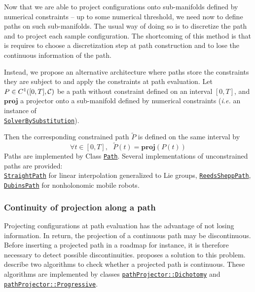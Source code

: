 Now that we are able to project configurations onto sub-manifolds defined by numerical constraints -- up to some numerical threshold, we need now to define paths on such sub-manifolds. The usual way of doing so is to discretize the path and to project each sample configuration. The shortcoming of this method is that is requires to choose a discretization step at path construction and to lose the continuous information of the path.

Instead, we propose an alternative architecture where paths store the constraints they are subject to and apply the constraints at path evaluation. Let $P\in C^1([0,T],\mathcal{C})$ be a path without constraint defined on an interval $[0,T]$, and $\mathbf{proj}$ a projector onto a sub-manifold defined by numerical constraints (\textit{i.e.} an instance of\\ \href{https://gepettoweb.laas.fr/hpp/hpp-constraints/doxygen-html/classhpp_1_1constraints_1_1solver_1_1BySubstitution.html}{\texttt{SolverBySubstitution}}).

Then the corresponding constrained path $\tilde{P}$ is defined on the same interval by
$$
\forall t\in[0,T],\ \ \ \tilde{P}(t) = \mathbf{proj}(P(t))
$$
Paths are implemented by Class \href{https://gepettoweb.laas.fr/hpp/hpp-core/doxygen-html/classhpp_1_1core_1_1Path.html}{\texttt{Path}}. Several implementations of unconstrained paths are provided:\\
\href{https://gepettoweb.laas.fr/hpp/hpp-core/doxygen-html/classhpp_1_1core_1_1StraightPath.html}{\texttt{StraightPath}} for linear interpolation generalized to Lie groups, \href{https://gepettoweb.laas.fr/hpp/hpp-core/doxygen-html/classhpp_1_1core_1_1ReedsSheppPath.html}{\texttt{ReedsSheppPath}}, \href{https://gepettoweb.laas.fr/hpp/hpp-core/doxygen-html/classhpp_1_1core_1_1DubinsPath.html}{\texttt{DubinsPath}} for non\-holo\-nomic mobile robots.

\subsubsection{Continuity of projection along a path}

Projecting configurations at path evaluation has the advantage of not losing information. In return, the projection of a continuous path may be discontinuous. Before inserting a projected path in a roadmap for instance, it is therefore necessary to detect possible discontinuities. \cite{Hauser-RSS-13} proposes a solution to this problem. \cite{mirabel:hal-01360409} describe two algorithms to check whether a projected path is continuous. These algorithms are implemented by
classes \href{https://gepettoweb.laas.fr/hpp/hpp-core/doxygen-html/classhpp_1_1core_1_1pathProjector_1_1Dichotomy.html}{\texttt{pathProjector::Dichotomy}} and \href{https://gepettoweb.laas.fr/hpp/hpp-core/doxygen-html/classhpp_1_1core_1_1pathProjector_1_1Progressive.html}{\texttt{pathProjector::Progressive}}.

